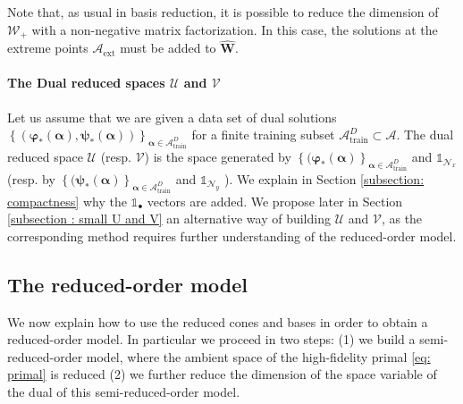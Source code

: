 \documentclass{article}
\def\cA{\mathcal{A}}
\def\cN{\mathcal{N}}
\def\cU{\mathcal{U}}
\def\cV{\mathcal{V}}
\def\cW{\mathcal{W}}
\def\aalpha{\boldsymbol{\alpha}}
\def\pphi{\boldsymbol{\varphi}}
\def\ppsi{\boldsymbol{\psi}}
\def\WW{\mathbf{W}}
\def\11{\mathbb{1}}
\begin{document}
Note that, as usual in basis reduction,  it is possible to reduce the dimension of $\cW_+$ with a non-negative matrix factorization. In this case, the solutions at the extreme points $\cA_{\text{ext}}$ must be added to $\widehat{\WW}$.
%
\paragraph{The Dual reduced spaces \texorpdfstring{$\mathcal{U}$ and $\mathcal{V}$}{} }
%
Let us assume that we are given a data set of dual solutions $\left\lbrace (\pphi_*(\aalpha), \ppsi_*(\aalpha) ) \right\rbrace_{\aalpha \in \cA_{\text{train}}^D}$ for a finite training subset $\cA_{\text{train}}^D \subset \cA$. 
The dual reduced space $\cU$ (resp. $\cV$) is the space generated by $\left\lbrace (\pphi_*(\aalpha) \right\rbrace_{\aalpha \in \cA_{\text{train}}^D}$ and $\11_{\cN_x}$ (resp. by $\left\lbrace (\ppsi_*(\aalpha) \right\rbrace_{\aalpha \in \cA_{\text{train}}^D}$ and $\11_{\cN_y}$ ). We explain in Section \ref{subsection: compactness} why the $\11_{\bullet}$ vectors are added. We propose later in Section \ref{subsection : small U and V} an alternative way of building $\cU$ and $\cV$, as the corresponding method requires further understanding of the reduced-order model.



\subsection{The reduced-order model}
%
We now explain how to use the reduced cones and bases in order to obtain a reduced-order model. In particular we  proceed in two steps: (1) we  build a semi-reduced-order model, where the ambient space  of the high-fidelity primal \eqref{eq: primal} is reduced (2) we further reduce the dimension of the space variable of the dual of this semi-reduced-order model.
\end{document}
